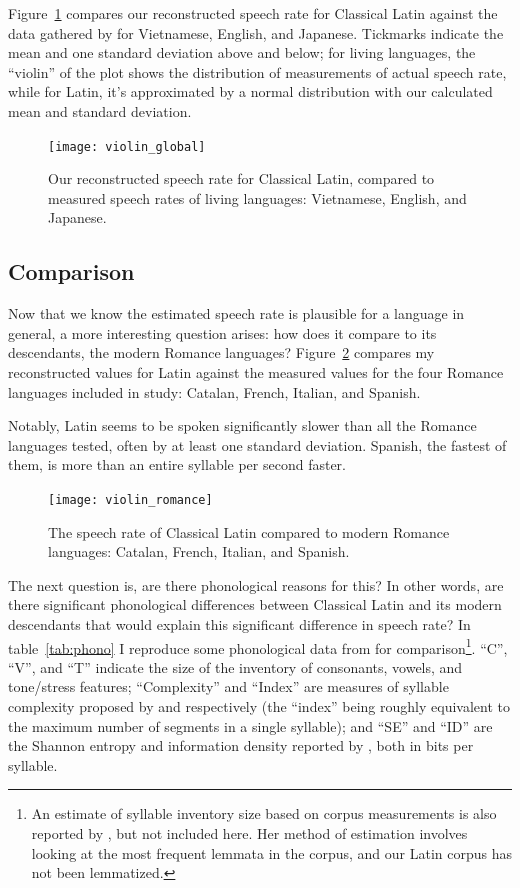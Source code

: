 \documentclass[12pt,twoside]{article}
\begin{document}
Figure~\ref{fig:violin1} compares our reconstructed speech rate for Classical Latin against the data gathered by \citet{coupé} for Vietnamese, English, and Japanese. Tickmarks indicate the mean and one standard deviation above and below; for living languages, the ``violin'' of the plot shows the distribution of measurements of actual speech rate, while for Latin, it's approximated by a normal distribution with our calculated mean and standard deviation.

\begin{figure}[p]
\centering
\caption{Our reconstructed speech rate for Classical Latin, compared to measured speech rates of living languages: Vietnamese, English, and Japanese.}
\label{fig:violin1}
\noindent\texttt{[image: violin\_global]}
\end{figure}

\subsection{Comparison}

Now that we know the estimated speech rate is plausible for a language in general, a more interesting question arises: how does it compare to its descendants, the modern Romance languages? Figure~\ref{fig:violin2} compares my reconstructed values for Latin against the measured values for the four Romance languages included in  study: Catalan, French, Italian, and Spanish.

Notably, Latin seems to be spoken significantly slower than all the Romance languages tested, often by at least one standard deviation. Spanish, the fastest of them, is more than an entire syllable per second faster.

\begin{figure}[p]
\centering
\caption{The speech rate of Classical Latin compared to modern Romance languages: Catalan, French, Italian, and Spanish.}
\label{fig:violin2}
\noindent\texttt{[image: violin\_romance]}
\end{figure}

The next question is, are there phonological reasons for this? In other words, are there significant phonological differences between Classical Latin and its modern descendants that would explain this significant difference in speech rate? In table~\ref{tab:phono} I reproduce some phonological data from \citet{oh} for comparison\footnote{An estimate of syllable inventory size based on corpus measurements is also reported by \citet{oh}, but not included here. Her method of estimation involves looking at the most frequent lemmata in the corpus, and our Latin corpus has not been lemmatized.}. ``C'', ``V'', and ``T'' indicate the size of the inventory of consonants, vowels, and tone/stress features; ``Complexity'' and ``Index'' are measures of syllable complexity proposed by \citet{wals} and \citet{lapsyd} respectively (the ``index'' being roughly equivalent to the maximum number of segments in a single syllable); and ``SE'' and ``ID'' are the Shannon entropy and information density reported by \citet{oh}, both in bits per syllable.
\end{document}
